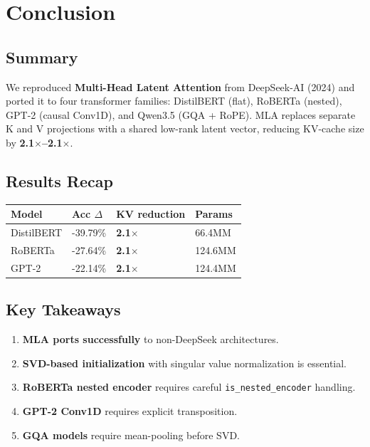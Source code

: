 
\section{Conclusion}

\subsection{Summary}

We reproduced \textbf{Multi-Head Latent Attention} from DeepSeek-AI (2024) and 
ported it to four transformer families: DistilBERT (flat), RoBERTa 
(nested), GPT-2 (causal Conv1D), and Qwen3.5 (GQA + RoPE). MLA replaces 
separate K and V projections with a shared low-rank latent vector, 
reducing KV-cache size by \textbf{2.1$\times$--2.1$\times$}.

\subsection{Results Recap}

\begin{table}[H]
\centering
\small
\begin{tabular}{llll}
\toprule
\textbf{Model} & \textbf{Acc $\Delta$} & \textbf{KV reduction} & \textbf{Params} \\
\midrule
DistilBERT & -39.79\% & \textbf{2.1$\times$} & 66.4MM \\
RoBERTa & -27.64\% & \textbf{2.1$\times$} & 124.6MM \\
GPT-2 & -22.14\% & \textbf{2.1$\times$} & 124.4MM \\
\bottomrule
\end{tabular}
\end{table}

\subsection{Key Takeaways}

\begin{enumerate}
\item \textbf{MLA ports successfully} to non-DeepSeek architectures.
\item \textbf{SVD-based initialization} with singular value normalization is
  essential.
\item \textbf{RoBERTa nested encoder} requires careful \texttt{is\_nested\_encoder} handling.
\item \textbf{GPT-2 Conv1D} requires explicit transposition.
\item \textbf{GQA models} require mean-pooling before SVD.

\end{enumerate}
